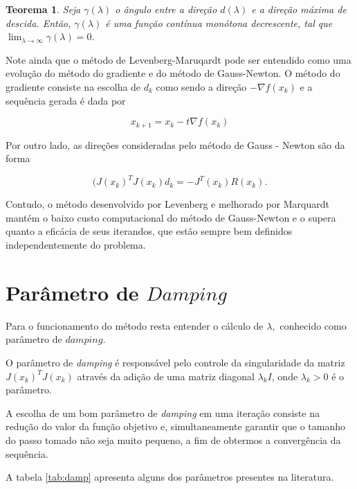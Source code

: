\documentclass[12pt,a4paper]{article}
\newtheorem{teo}{Teorema}[section]
\newcounter{ex}[section]
\begin{document}
	\begin{teo}
		Seja $\gamma (\lambda)$ o ângulo entre a direção $d(\lambda)$ e a direção máxima de descida. Então, $\gamma(\lambda)$ é uma função contínua monótona decrescente, tal que  $\lim_{\lambda\rightarrow \infty}{\gamma(\lambda)} = 0.$
	\end{teo}

	Note ainda que o método de Levenberg-Maruqardt pode ser entendido como uma evolução do método do gradiente e do método de Gauss-Newton. O método do gradiente consiste na escolha de $d_k$ como sendo a direção $-\nabla f(x_k)$ e a sequência gerada é dada por
	
	\[x_{k+1} = x_k - t \nabla f(x_k)\]
	
	Por outro lado, as direções consideradas pelo método de Gauss - Newton são da forma 
	
	\[ (J(x_k)^{T}J(x_k)d_k = -J^T(x_k)R(x_k). \]
	
	Contudo, o método desenvolvido por Levenberg e melhorado por Marquardt mantém o baixo custo computacional do método de Gauss-Newton e o supera quanto a eficácia de seus iterandos, que estão sempre bem definidos independentemente do problema.
		
	\section{Parâmetro de $Damping$}\label{pd}
	\label{sec:subsec02}
	Para o funcionamento do método resta entender o cálculo de $\lambda,$ conhecido como parâmetro de $damping.$ 
	
	O parâmetro de \textit{damping} é responsável pelo controle da singularidade da matriz $J(x_k)^T J(x_k)$ através da adição de uma matriz diagonal $\lambda_k I$, onde $\lambda_k > 0$ é o parâmetro.
	
	A escolha de um bom parâmetro de \textit{damping} em uma iteração consiste na redução do valor da função objetivo e, simultaneamente garantir que o tamanho do passo tomado não seja muito pequeno, a fim de obtermos a convergência da sequência.
	
	A tabela \ref{tab:damp} apresenta alguns dos parâmetros presentes na literatura.
	
\end{document}
